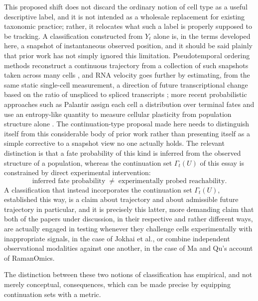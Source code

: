 \documentclass[11pt]{article}
\begin{document}
This proposed shift does not discard the ordinary notion of cell type as a useful descriptive label, and it is not intended as a wholesale replacement for existing taxonomic practice; rather, it relocates what such a label is properly supposed to be tracking. A classification constructed from $Y_t$ alone is, in the terms developed here, a snapshot of instantaneous observed position, and it should be said plainly that prior work has not simply ignored this limitation. Pseudotemporal ordering methods reconstruct a continuous trajectory from a collection of such snapshots taken across many cells \cite{trapnell2014}, and RNA velocity goes further by estimating, from the same static single-cell measurement, a direction of future transcriptional change based on the ratio of unspliced to spliced transcripts \cite{lamanno2018}; more recent probabilistic approaches such as Palantir assign each cell a distribution over terminal fates and use an entropy-like quantity to measure cellular plasticity from population structure alone \cite{setty2019}. The continuation-type proposal made here needs to distinguish itself from this considerable body of prior work rather than presenting itself as a simple corrective to a snapshot view no one actually holds. The relevant distinction is that a fate probability of this kind is inferred from the observed structure of a population, whereas the continuation set $\Gamma_t(U)$ of this essay is constrained by direct experimental intervention:
\begin{equation}
\text{inferred fate probability} \;\neq\; \text{experimentally probed reachability}.
\end{equation}
A classification that instead incorporates the continuation set $\Gamma_t(U)$, established this way, is a claim about trajectory and about admissible future trajectory in particular, and it is precisely this latter, more demanding claim that both of the papers under discussion, in their respective and rather different ways, are actually engaged in testing whenever they challenge cells experimentally with inappropriate signals, in the case of Jokhai et al., or combine independent observational modalities against one another, in the case of Ma and Qu's account of RamanOmics.

The distinction between these two notions of classification has empirical, and not merely conceptual, consequences, which can be made precise by equipping continuation sets with a metric.
\end{document}
